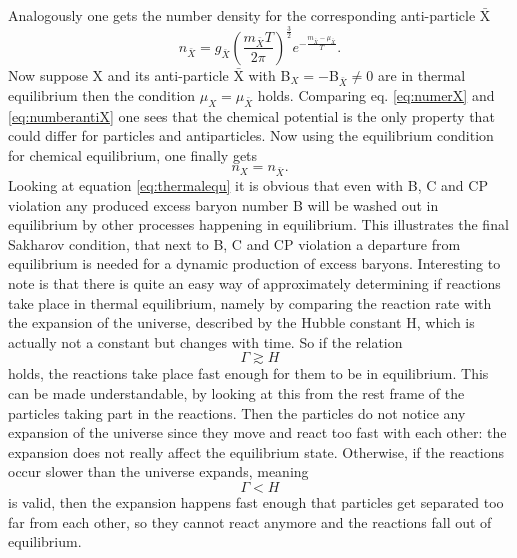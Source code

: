 Analogously one gets the number density for the corresponding anti-particle $\bar{\text{X}}$
\begin{equation}
	n_{\bar{X}}=g_{\bar{X}}\left(\frac{m_{\bar{X}}T}{2\pi}\right)^\frac{3}{2}e^{-\frac{m_{\bar{X}}-\mu_{\bar{X}}}{T}}.
\label{eq:numberantiX}
\end{equation}
Now suppose X and its anti-particle $\bar{\text{X}}$  with B$_X=-$B$_{\bar{X}}\neq0$ are in thermal equilibrium then the condition $\mu_X=\mu_{\bar{X}}$ holds. Comparing eq. \eqref{eq:numerX} and \eqref{eq:numberantiX} one sees that the chemical potential is the only property that could differ for particles and antiparticles. Now using the equilibrium condition for chemical equilibrium, one finally gets
\begin{equation}
	n_X=n_{\bar{X}}.
	\label{eq:thermalequ}
\end{equation}
Looking at equation \eqref{eq:thermalequ} it is obvious that even with B, C and CP violation any produced excess baryon number B will be washed out in equilibrium by other processes happening in equilibrium. \newline\indent
This illustrates the final Sakharov condition, that next to B, C and CP violation a departure from equilibrium is needed for a dynamic production of excess baryons. \newline\indent
Interesting to note is that there is quite an easy way of approximately determining if reactions take place in thermal equilibrium, namely by comparing the reaction rate with the expansion of the universe, described by the Hubble constant H, which is actually not a constant but changes with time. So if the relation 
\begin{equation}
	\Gamma\gtrsim H
	\label{eq:rate_g_hubble}
\end{equation}
holds, the reactions take place fast enough for them to be in equilibrium. This can be made understandable, by looking at this from the rest frame of the particles taking part in the reactions. Then the particles do not notice any expansion of the universe since they move and react too fast with each other: the expansion does not really affect the equilibrium state. \newline\indent
Otherwise, if the reactions occur slower than the universe expands, meaning
\begin{equation}
	\Gamma<H
	\label{eq:rate_s_hubble}
\end{equation}
is valid, then the expansion happens fast enough that particles get separated too far from each other, so they cannot react anymore and the reactions fall out of equilibrium.
